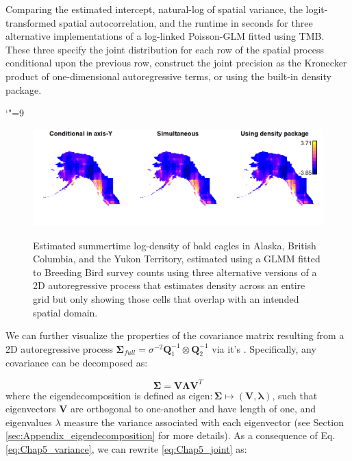 \begin{table} 
    \caption[Comparing three specifications for two-dimensional spatial GLMM]{Comparing the estimated intercept, natural-log of spatial variance, the logit-transformed spatial autocorrelation, and the runtime in seconds for three alternative implementations of a log-linked Poisson-GLM fitted using TMB.  These three specify the joint distribution for each row of the spatial process conditional upon the previous row, construct the joint precision as the Kronecker product of one-dimensional autoregressive terms, or using the built-in \colorbox{backblue}{density} package.}
    \catcode`"=9
  \centering
    \label{tab:Chap5_comparing_parameters}
\end{table} 

\begin{figure}[!ht]
    \caption[GLMM estimates of bald eagle densities using three alternative methods]{Estimated summertime log-density of bald eagles in Alaska, British Columbia, and the Yukon Territory, estimated using a GLMM fitted to Breeding Bird survey counts using three alternative versions of a 2D autoregressive process that estimates density across an entire grid but only showing those cells that overlap with an intended spatial domain.}
    \centering
    \includegraphics[width=5.5in]{Chap_5/Mapped_densities.png}
    \label{fig:Chap5_mapped_densities}
\end{figure}

We can further visualize the properties of the covariance matrix resulting from a 2D autoregressive process \(\mathbf{\Sigma}_{full} = \sigma^{-2} \mathbf{Q}_1^{-1} \otimes \mathbf{Q}_2^{-1}\) via it's .  Specifically, any covariance can be decomposed as:

\begin{equation} \label{eq:Chap5_eigen}
    \mathbf{\Sigma} = \mathbf{V \Lambda V}^T
\end{equation}
where the eigendecomposition is defined as \( \mathrm{eigen}: \mathbf{\Sigma} \mapsto ( \mathbf{V, \lambda} ) \), such that eigenvectors \(\mathbf{V}\) are orthogonal to one-another and have length of one, and eigenvalues \(\lambda\) measure the variance associated with each eigenvector (see Section \ref{sec:Appendix_eigendecomposition} for more details).  As a consequence of Eq. \ref{eq:Chap5_variance}, we can rewrite \ref{eq:Chap5_joint} as:


